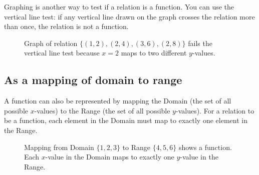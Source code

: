 \documentclass[12pt]{article}
\begin{document}
Graphing is another way to test if a relation is a function. You can use the
vertical line test: if any vertical line drawn on the graph crosses the relation
more than once, the relation is not a function.

\begin{figure}[h]
  \centering
  \caption{Graph of relation $\{ (1, 2), (2, 4), (3, 6), (2, 8) \}$ fails the vertical line test because $x = 2$ maps to two different $y$-values.}
\end{figure}

\subsection{As a mapping of domain to range}

A function can also be represented by mapping the Domain (the set of all
possible $x$-values) to the Range (the set of all possible $y$-values). For a
relation to be a function, each element in the Domain must map to exactly one
element in the Range.

\begin{figure}[h]
  \centering
  \caption{Mapping from Domain $\{ 1, 2, 3 \}$ to Range $\{ 4, 5, 6 \}$ shows a function. Each $x$-value in the Domain maps to exactly one $y$-value in the Range.}
\end{figure}
\end{document}
